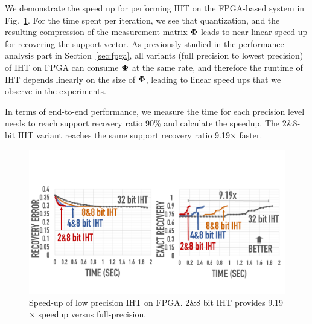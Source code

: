 \documentclass[aoas,preprint]{imsart}
\numberwithin{equation}{section}
\theoremstyle{plain}
\begin{document}
{We demonstrate the speed up for performing IHT on the FPGA-based system in Fig.~\ref{fig:fpga_time}. For the time spent per iteration, we see that quantization, and the resulting compression of the measurement matrix ${\bf \Phi}$ leads to near linear speed up for recovering the support vector. As previously studied in the performance analysis part in Section~\ref{sec:fpga}, all variants (full precision to lowest precision) of IHT on FPGA can consume ${\bf \Phi}$ at the same rate, and therefore the runtime of IHT depends linearly on the size of ${\bf \Phi}$, leading to linear speed ups that we observe in the experiments.
\vspace{0.5em}

In terms of end-to-end performance, we measure the time for
each precision level needs to reach support recovery
ratio 90\% and calculate the speedup. The 2\&8-bit IHT variant reaches the same support recovery
ratio 9.19$\times$ faster.




\begin{figure}[t!]
\centering
\includegraphics[width=1.02\columnwidth, angle=0]{figs/fpga.pdf}
\caption{Speed-up of low precision IHT on FPGA. 2\&8 bit IHT provides 9.19$\times$ speedup versus full-precision.}
\label{fig:fpga_time}
\end{figure}
\vspace{-1em}
}
\end{document}
